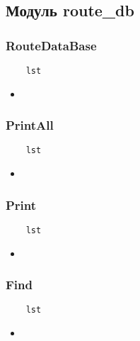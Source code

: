 \subsection{Модуль route\_db}

\subsubsection{RouteDataBase}

\begin{lstlisting}
    lst
\end{lstlisting}

\begin{itemize}
    \item \verb||
\end{itemize}

\subsubsection{PrintAll}

\begin{lstlisting}
    lst
\end{lstlisting}

\begin{itemize}
    \item \verb||
\end{itemize}

\subsubsection{Print}

\begin{lstlisting}
    lst
\end{lstlisting}

\begin{itemize}
    \item \verb||
\end{itemize}

\subsubsection{Find}

\begin{lstlisting}
    lst
\end{lstlisting}

\begin{itemize}
    \item \verb||
\end{itemize}

